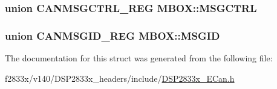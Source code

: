 \subsubsection[{M\+S\+G\+C\+T\+R\+L}]{\setlength{\rightskip}{0pt plus 5cm}union {\bf C\+A\+N\+M\+S\+G\+C\+T\+R\+L\+\_\+\+R\+E\+G} M\+B\+O\+X\+::\+M\+S\+G\+C\+T\+R\+L}\label{struct_m_b_o_x_a9737a3ed69918d5077130d7c31142154}
\hypertarget{struct_m_b_o_x_a602299e8b2d4bac089e4d164138f0c24}{}
\subsubsection[{M\+S\+G\+I\+D}]{\setlength{\rightskip}{0pt plus 5cm}union {\bf C\+A\+N\+M\+S\+G\+I\+D\+\_\+\+R\+E\+G} M\+B\+O\+X\+::\+M\+S\+G\+I\+D}\label{struct_m_b_o_x_a602299e8b2d4bac089e4d164138f0c24}


The documentation for this struct was generated from the following file\+:\begin{DoxyCompactItemize}
\item 
f2833x/v140/\+D\+S\+P2833x\+\_\+headers/include/\hyperlink{_d_s_p2833x___e_can_8h}{D\+S\+P2833x\+\_\+\+E\+Can.\+h}\end{DoxyCompactItemize}
